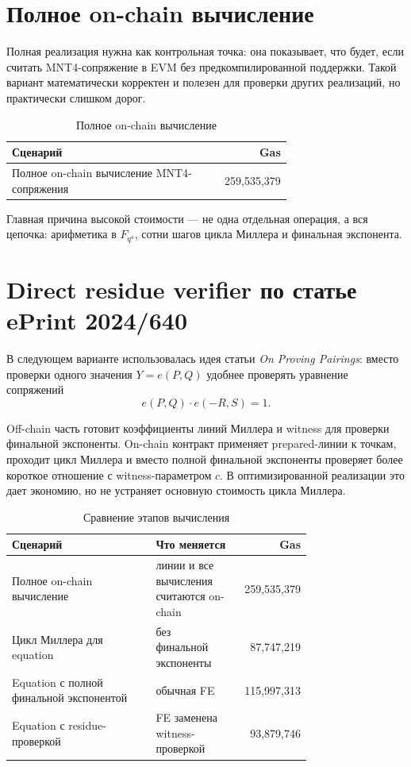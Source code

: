 \documentclass[12pt,a4paper]{article}
\begin{document}
\section{Полное on-chain вычисление}

Полная реализация нужна как контрольная точка: она показывает, что будет, если считать MNT4-сопряжение в EVM без предкомпилированной поддержки. Такой вариант математически корректен и полезен для проверки других реализаций, но практически слишком дорог.

\begin{table}[h!]
\centering
\caption{Полное on-chain вычисление}
\begin{tabular}{p{0.70\linewidth}r}
\toprule
Сценарий & Gas \\
\midrule
Полное on-chain вычисление MNT4-сопряжения & 259,535,379 \\
\bottomrule
\end{tabular}
\end{table}

Главная причина высокой стоимости --- не одна отдельная операция, а вся цепочка: арифметика в \(F_{q^4}\), сотни шагов цикла Миллера и финальная экспонента.

\section{Direct residue verifier по статье ePrint 2024/640}

В следующем варианте использовалась идея статьи \emph{On Proving Pairings}: вместо проверки одного значения \(Y=e(P,Q)\) удобнее проверять уравнение сопряжений
\[
    e(P,Q)\cdot e(-R,S)=1.
\]

Off-chain часть готовит коэффициенты линий Миллера и witness для проверки финальной экспоненты. On-chain контракт применяет prepared-линии к точкам, проходит цикл Миллера и вместо полной финальной экспоненты проверяет более короткое отношение с witness-параметром \(c\). В оптимизированной реализации это дает экономию, но не устраняет основную стоимость цикла Миллера.

\begin{table}[h!]
\centering
\caption{Сравнение этапов вычисления}
\begin{tabular}{p{0.48\linewidth}p{0.27\linewidth}r}
\toprule
Сценарий & Что меняется & Gas \\
\midrule
Полное on-chain вычисление & линии и все вычисления считаются on-chain & 259,535,379 \\
Цикл Миллера для equation & без финальной экспоненты & 87,747,219 \\
Equation с полной финальной экспонентой & обычная FE & 115,997,313 \\
Equation с residue-проверкой & FE заменена witness-проверкой & 93,879,746 \\
\bottomrule
\end{tabular}
\end{table}
\end{document}
